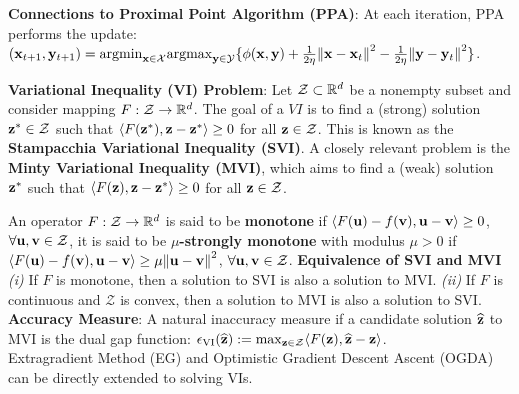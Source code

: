 \textbf{Connections to Proximal Point Algorithm (PPA)}: At each iteration, PPA performs the update: $(\mathbf{x}_{t+1}, \mathbf{y}_{t+1}) = \mathrm{argmin}_{\mathbf{x} \in \mathcal{X}} \mathrm{argmax}_{\mathbf{y} \in \mathcal{Y}} \{ \phi(\mathbf{x}, \mathbf{y}) + \frac{1}{2\eta}\norm{\mathbf{x} - \mathbf{x}_t}^2 - \frac{1}{2\eta}\norm{\mathbf{y} - \mathbf{y}_t}^2 \}$. \\
\begin{framed}
    \textbf{Variational Inequality (VI) Problem}: Let $\mathcal{Z} \subset \mathbb{R}^d$ be a nonempty subset and consider mapping $F : \mathcal{Z} \rightarrow \mathbb{R}^d$. The goal of a $VI$ is to find a (strong) solution $\mathbf{z}^* \in \mathcal{Z}$ such that $\langle F(\mathbf{z}^*), \mathbf{z} - \mathbf{z}^* \rangle \geq 0$ for all $\mathbf{z} \in \mathcal{Z}$. This is known as the \textbf{Stampacchia Variational Inequality (SVI)}. A closely relevant problem is the \textbf{Minty Variational Inequality (MVI)}, which aims to find a (weak) solution $\mathbf{z}^*$ such that $\langle F(\mathbf{z}), \mathbf{z} - \mathbf{z}^* \rangle \geq 0$ for all $\mathbf{z} \in \mathcal{Z}$.
\end{framed}
An operator $F : \mathcal{Z} \rightarrow \mathbb{R}^d$ is said to be \textbf{monotone} if $\langle F(\mathbf{u}) - f(\mathbf{v}), \mathbf{u} - \mathbf{v} \rangle \geq 0$, $\forall \mathbf{u}, \mathbf{v} \in \mathcal{Z}$, it is said to be \textbf{$\mu$-strongly monotone} with modulus $\mu > 0$ if $\langle F(\mathbf{u}) - f(\mathbf{v}), \mathbf{u} - \mathbf{v} \rangle \geq \mu \norm{\mathbf{u} - \mathbf{v}}^2$, $\forall \mathbf{u}, \mathbf{v} \in \mathcal{Z}$.
\textbf{Equivalence of SVI and MVI} \textit{(i)} If $F$ is monotone, then a solution to SVI is also a solution to MVI. \textit{(ii)} If $F$ is continuous and $\mathcal{Z}$ is convex, then a solution to MVI is also a solution to SVI. \\
\textbf{Accuracy Measure}: A natural inaccuracy measure if a candidate solution $\widehat{\mathbf{z}}$ to MVI is the dual gap function: $\epsilon_{\text{VI}}(\widehat{\mathbf{z}}) := \max_{\mathbf{z} \in \mathcal{Z}} \langle F(\mathbf{z}), \widehat{\mathbf{z}} - \mathbf{z} \rangle$. \\
Extragradient Method (EG) and Optimistic Gradient Descent Ascent (OGDA) can be directly extended to solving VIs. 